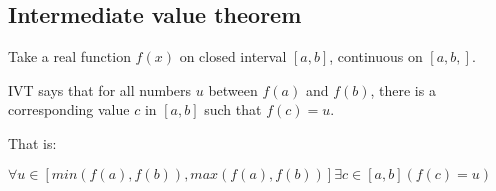 
\subsection{Intermediate value theorem}

Take a real function \(f(x)\) on closed interval \([a,b]\), continuous on \([a,b,]\).

IVT says that for all numbers \(u\) between \(f(a)\) and \(f(b)\), there is a corresponding value \(c\) in \([a,b]\) such that \(f(c)=u\).

That is:

\(\forall u \in [min(f(a),f(b)),max(f(a),f(b))] \exists c \in [a,b] (f(c)=u)\)

